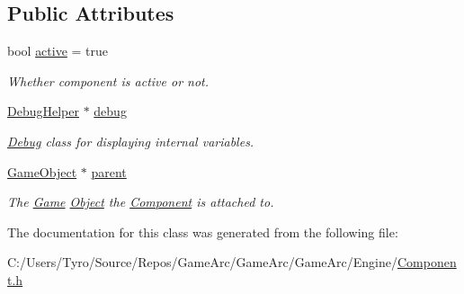 \subsection*{Public Attributes}
\begin{DoxyCompactItemize}
\item 
\mbox{\label{class_component_a2ebc869395d66425690dfeae99d1b791}} 
bool \mbox{\hyperlink{class_component_a2ebc869395d66425690dfeae99d1b791}{active}} = true
\begin{DoxyCompactList}\small\item\em Whether component is active or not. \end{DoxyCompactList}\item 
\mbox{\label{class_component_a34ff24093894370eb2e25e0bc2833348}} 
\mbox{\hyperlink{class_debug_helper}{Debug\+Helper}} $\ast$ \mbox{\hyperlink{class_component_a34ff24093894370eb2e25e0bc2833348}{debug}}
\begin{DoxyCompactList}\small\item\em \mbox{\hyperlink{class_debug}{Debug}} class for displaying internal variables. \end{DoxyCompactList}\item 
\mbox{\label{class_component_a2b66804cabef14a2884c2d35f71a24ea}} 
\mbox{\hyperlink{class_game_object}{Game\+Object}} $\ast$ \mbox{\hyperlink{class_component_a2b66804cabef14a2884c2d35f71a24ea}{parent}}
\begin{DoxyCompactList}\small\item\em The \mbox{\hyperlink{class_game}{Game}} \mbox{\hyperlink{class_object}{Object}} the \mbox{\hyperlink{class_component}{Component}} is attached to. \end{DoxyCompactList}\end{DoxyCompactItemize}


The documentation for this class was generated from the following file\+:\begin{DoxyCompactItemize}
\item 
C\+:/\+Users/\+Tyro/\+Source/\+Repos/\+Game\+Arc/\+Game\+Arc/\+Game\+Arc/\+Engine/\mbox{\hyperlink{_component_8h}{Component.\+h}}\end{DoxyCompactItemize}
